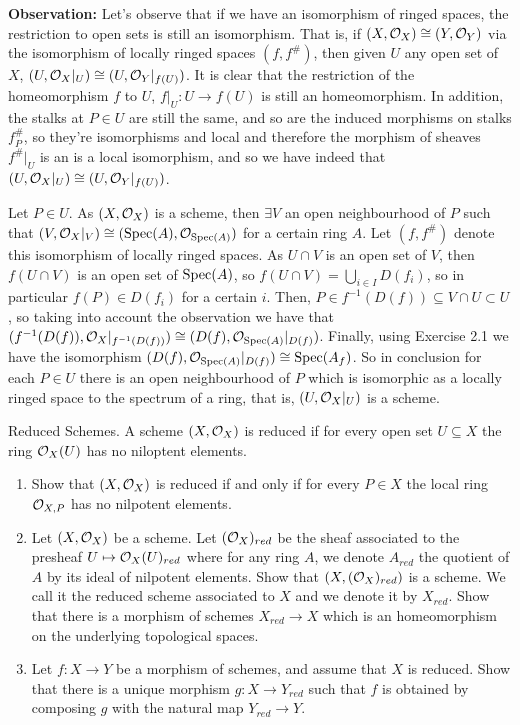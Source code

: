 \begin{sol}
	\textbf{Observation:} Let's observe that if we have an isomorphism of ringed spaces, the restriction to open sets is still an isomorphism. That is, if $(X, \mathcal{O}_X) \cong (Y, \mathcal{O}_Y)$ via the isomorphism of locally ringed spaces $(f, f^{\#})$, then given $U$ any open set of $X$, $(U, \mathcal{O}_X|_U) \cong (U, \mathcal{O}_Y|_{f(U)})$. It is clear that the restriction of the homeomorphism $f$ to $U$, $f|_U: U \to f(U)$ is still an homeomorphism. In addition, the stalks at $P \in U$ are still the same, and so are the induced morphisms on stalks $f^{\#}_P$, so they're isomorphisms and local and therefore the morphism of sheaves $f^{\#}|_U$ is an is a local isomorphism, and so we have indeed that $(U, \mathcal{O}_X|_U) \cong (U, \mathcal{O}_Y|_{f(U)})$.

	Let $P \in U$. As $(X, \mathcal{O}_X)$ is a scheme, then $\exists V$ an open neighbourhood of $P$ such that $(V,\mathcal{O}_X|_V) \cong (\mathrm{Spec} (A), \mathcal{O}_{\mathrm{Spec}(A)})$ for a certain ring $A$. Let $(f, f^{\#})$ denote this isomorphism of locally ringed spaces. As $U \cap V$ is an open set of $V$, then $f(U \cap V)$ is an open set of $\mathrm{Spec}(A)$, so $f(U \cap V) = \bigcup_{i \in I} D(f_i)$, so in particular $f(P) \in D(f_i)$ for a certain $i$. Then, $P \in f^{-1}(D(f)) \subseteq V \cap U \subset U$, so taking into account the observation we have that $(f^{-1}(D(f)), \mathcal{O}_X|_{f^{-1}(D(f))}) \cong (D(f), \mathcal{O}_{\mathrm{Spec}(A)}|_{D(f)})$. Finally, using Exercise 2.1 we have the isomorphism $(D(f), \mathcal{O}_{\mathrm{Spec}(A)}|_{D(f)}) \cong \mathrm{Spec}(A_f)$. So in conclusion for each $P \in U$ there is an open neighbourhood of $P$ which is isomorphic as a locally ringed space to the spectrum of a ring, that is, $(U, \mathcal{O}_X|_U)$ is a scheme.
\end{sol}

\begin{ex}
	Reduced Schemes. A scheme $(X, \mathcal{O}_X)$ is reduced if for every open set $U \subseteq X$ the ring $\mathcal{O}_X(U)$ has no niloptent elements.
	\begin{enumerate}[label=\alph*)]
		\item Show that $(X, \mathcal{O}_X)$ is reduced if and only if for every $P \in X$ the local ring $\mathcal{O}_{X,P}$ has no nilpotent elements.
		\item Let $(X, \mathcal{O}_X)$ be a scheme. Let $(\mathcal{O}_X)_{red}$ be the sheaf associated to the presheaf $U \mapsto \mathcal{O}_X(U)_{red}$ where for any ring $A$, we denote $A_{red}$ the quotient of $A$ by its ideal of nilpotent elements. Show that $(X, (\mathcal{O}_X)_{red})$ is a scheme. We call it the reduced scheme associated to $X$ and we denote it by $X_{red}$. Show that there is a morphism of schemes $X_{red} \to X$ which is an homeomorphism on the underlying topological spaces. 
		\item Let $f: X \to Y$ be a morphism of schemes, and assume that $X$ is reduced. Show that there is a unique morphism $g: X \to Y_{red}$ such that $f$ is obtained by composing $g$ with the natural map $Y_{red} \to Y$.
	\end{enumerate}
\end{ex}

